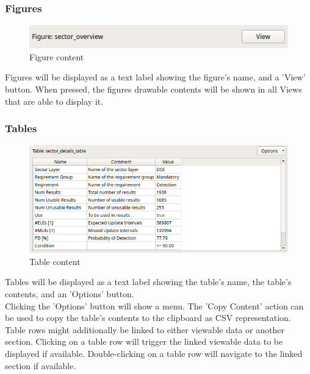 \subsubsection{Figures} 
\label{sec:report_section_figures}

\begin{figure}[H]
    \hspace*{-2.5cm}
    \center
    \includegraphics[width=12cm,frame]{figures/content_figure.png}
  \caption{Figure content}
\end{figure}

Figures will be displayed as a text label showing the figure's name, and a 'View' button. When pressed, the figures 
drawable contents will be shown in all Views that are able to display it.

\subsubsection{Tables} 
\label{sec:report_section_tables}

\begin{figure}[H]
    \hspace*{-2.5cm}
    \center
    \includegraphics[width=12cm,frame]{figures/content_table.png}
  \caption{Table content}
\end{figure}

Tables will be displayed as a text label showing the table's name, the table's contents, 
and an 'Options' button. \\

Clicking the 'Options' button will show a menu.
The 'Copy Content' action can be used to copy the table's contents to the clipboard as CSV representation. \\

Table rows might additionally be linked to either viewable data or another section.
Clicking on a table row will trigger the linked viewable data to be displayed if available.
Double-clicking on a table row will navigate to the linked section if available.

